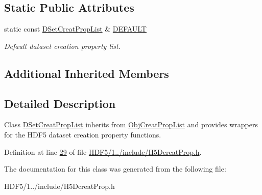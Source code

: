 \subsection*{Static Public Attributes}
\begin{DoxyCompactItemize}
\item 
\mbox{\label{class_h5_1_1_d_set_creat_prop_list_aea0be1dc39378736daeac7af787bbc8e}} 
static const \hyperlink{class_h5_1_1_d_set_creat_prop_list}{D\+Set\+Creat\+Prop\+List} \& \hyperlink{class_h5_1_1_d_set_creat_prop_list_aea0be1dc39378736daeac7af787bbc8e}{D\+E\+F\+A\+U\+LT}
\begin{DoxyCompactList}\small\item\em Default dataset creation property list. \end{DoxyCompactList}\end{DoxyCompactItemize}
\subsection*{Additional Inherited Members}


\subsection{Detailed Description}
Class \hyperlink{class_h5_1_1_d_set_creat_prop_list}{D\+Set\+Creat\+Prop\+List} inherits from \hyperlink{class_h5_1_1_obj_creat_prop_list}{Obj\+Creat\+Prop\+List} and provides wrappers for the H\+D\+F5 dataset creation property functions. 

Definition at line \hyperlink{_h_d_f5_21_810_81_2include_2_h5_dcreat_prop_8h_source_l00029}{29} of file \hyperlink{_h_d_f5_21_810_81_2include_2_h5_dcreat_prop_8h_source}{H\+D\+F5/1../include/\+H5\+Dcreat\+Prop.\+h}.



The documentation for this class was generated from the following file\+:\begin{DoxyCompactItemize}
\item 
H\+D\+F5/1../include/\+H5\+Dcreat\+Prop.\+h\end{DoxyCompactItemize}

